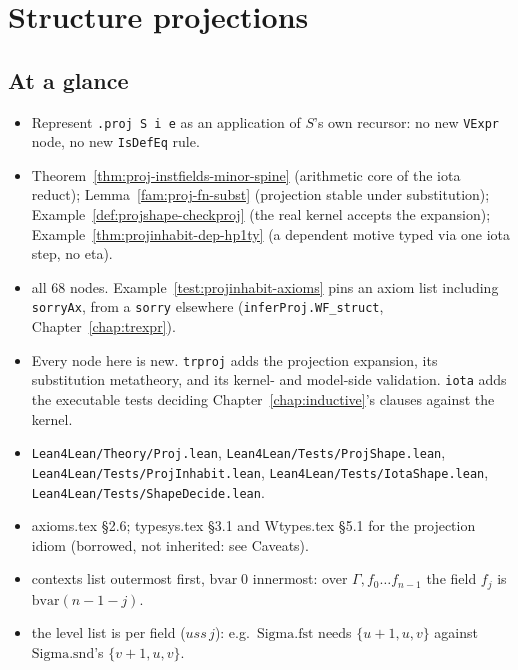 \chapter{Structure projections}
\label{chap:proj}

\section*{At a glance}
\begin{itemize}
\item {} Represent \texttt{.proj S i e} as an application of $S$'s own recursor: no new
\texttt{VExpr} node, no new \texttt{IsDefEq} rule.
\item {} Theorem~\ref{thm:proj-instfields-minor-spine} (arithmetic core of the
iota reduct); Lemma~\ref{fam:proj-fn-subst} (projection stable under substitution);
Example~\ref{def:projshape-checkproj} (the real kernel accepts the expansion);
Example~\ref{thm:projinhabit-dep-hp1ty} (a dependent motive typed via one iota step, no eta).
\item {} \stProved{} all 68 nodes. \stTainted{} Example~\ref{test:projinhabit-axioms}
pins an axiom list including \texttt{sorryAx}, from a \texttt{sorry} elsewhere
(\texttt{inferProj.WF\_struct}, Chapter~\ref{chap:trexpr}).
\item {} Every node here is new. \texttt{trproj} adds the projection expansion,
its substitution metatheory, and its kernel- and model-side validation. \texttt{iota} adds the
executable tests deciding Chapter~\ref{chap:inductive}'s clauses against the kernel.
\item {} \texttt{Lean4Lean/Theory/Proj.lean}, \texttt{Lean4Lean/Tests/ProjShape.lean},
\texttt{Lean4Lean/Tests/ProjInhabit.lean}, \texttt{Lean4Lean/Tests/IotaShape.lean},
\texttt{Lean4Lean/Tests/ShapeDecide.lean}.
\item {} axioms.tex \S2.6; typesys.tex \S3.1 and Wtypes.tex \S5.1 for the projection
idiom (borrowed, not inherited: see Caveats).
\end{itemize}

\begin{itemize}
\item {} contexts list outermost first, $\mathrm{bvar}\;0$ innermost: over
$\Gamma,f_0\dots f_{n-1}$ the field $f_j$ is $\mathrm{bvar}(n-1-j)$.
\item {} the level list is per field ($uss\,j$): e.g.\ $\mathrm{Sigma.fst}$ needs
$\{u+1,u,v\}$ against $\mathrm{Sigma.snd}$'s $\{v+1,u,v\}$.
\end{itemize}

